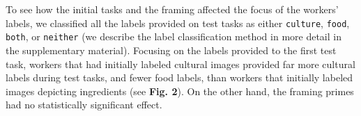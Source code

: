 \documentclass[12pt]{article}
\begin{document}
To see how the initial tasks and the framing affected 
the focus of the workers' labels, we classified all the labels provided
on test tasks as either \texttt{culture}, \texttt{food}, \texttt{both}, or 
\texttt{neither} (we describe the label classification method in more detail
in the supplementary material).  Focusing on the labels provided to the first 
test task,
workers that had initially labeled cultural images provided far more cultural
labels during test tasks, and fewer food labels, than workers that initially
labeled images depicting ingredients (see \textbf{Fig. 2}).  On the other 
hand, the framing primes had no statistically significant effect.

%
\end{document}
